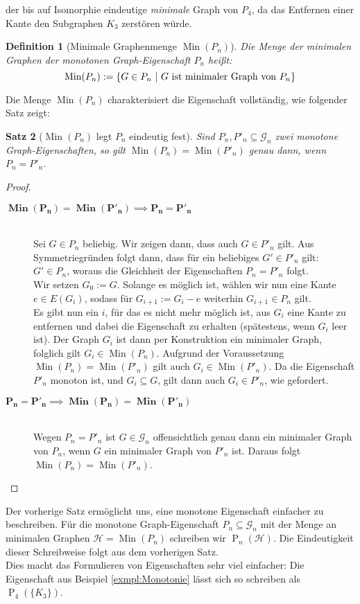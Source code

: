 \documentclass[a4paper]{scrreprt}
\newtheorem{definition}{Definition}
\newtheorem{Satz}[definition]{Satz}
\theoremstyle{definition}
\DeclareMathOperator\Min{Min}
\begin{document}
der bis auf Isomorphie eindeutige \emph{minimale} 
Graph von $P_4$, da das Entfernen einer Kante
den Subgraphen $K_3$ zerstören würde.

\begin{definition}[Minimale Graphenmenge $\Min(P_n)$]
Die Menge der minimalen Graphen der monotonen Graph-Eigenschaft
$P_n$ heißt:
$$\Min(P_n) := \{ G\in P_n \ | \ G \textup{ ist minimaler Graph von } P_n\}$$
\end{definition}

Die Menge $\Min(P_n)$ charakterisiert die
Eigenschaft vollständig, wie folgender Satz zeigt:

\begin{Satz}[$\Min(P_n)$ legt $P_n$ eindeutig fest]
Sind $P_n, P'_n \subseteq \mathcal{G}_n$ zwei monotone 
Graph-Eigenschaften, so gilt
$\Min(P_n) = \Min(P'_n)$ genau dann, wenn $P_n = P'_n$.
\end{Satz}
\begin{proof} \hfill
\begin{description}
\item[$\boldsymbol{\Min(P_n) = \Min(P'_n) \implies P_n = P'_n}$]
\hfill \\
Sei $G \in P_n$ beliebig. Wir zeigen dann, dass auch $G \in P'_n$
gilt. Aus Symmetriegründen folgt dann, dass für ein beliebiges 
$G' \in P'_n$ gilt: $G' \in P_n$, woraus die Gleichheit der
Eigenschaften $P_n = P'_n$ folgt. \\
Wir setzen $G_0 := G$. Solange es möglich ist, wählen wir nun
eine Kante $e \in E(G_i)$, sodass für $G_{i+1} := G_i - e$  
weiterhin $G_{i+1} \in P_n$ gilt. \\
Es gibt nun ein $i$, für das es nicht mehr möglich ist,
aus $G_i$ eine Kante zu entfernen und dabei die Eigenschaft
zu erhalten (spätestens, wenn $G_i$ leer ist).
Der Graph $G_i$ ist dann per Konstruktion ein minimaler
Graph, folglich gilt $G_i \in \Min(P_n)$. Aufgrund der
Voraussetzung $\Min(P_n) = \Min(P'_n)$ gilt auch 
$G_i \in \Min(P'_n)$. Da die Eigenschaft $P'_n$ monoton ist,
und $G_i \subseteq G$, gilt dann auch $G_i \in P'_n$,
wie gefordert.
\item[$\boldsymbol{P_n = P'_n \implies \Min(P_n) = \Min(P'_n)}$]
\hfill \\
Wegen $P_n = P'_n$ ist $G \in \mathcal{G}_n$ offensichtlich
genau dann ein minimaler Graph von $P_n$, wenn $G$ ein 
minimaler Graph von $P'_n$ ist. Daraus folgt 
$\Min(P_n) = \Min(P'_n)$.
\end{description}
\end{proof}
Der vorherige Satz ermöglicht uns, eine
monotone Eigenschaft einfacher zu beschreiben. 
Für die monotone Graph-Eigenschaft $P_n\subseteq \mathcal{G}_n$
mit der Menge an minimalen Graphen $\mathcal{H} = \Min(P_n)$
schreiben wir $\operatorname{P}_n(\mathcal{H})$. Die Eindeutigkeit dieser
Schreibweise folgt aus dem vorherigen Satz. \\
Dies macht das Formulieren von Eigenschaften sehr viel einfacher:
Die Eigenschaft aus Beispiel \ref{exmpl:Monotonie} lässt sich
so schreiben als $\operatorname{P}_4(\{K_3\})$.
\end{document}
